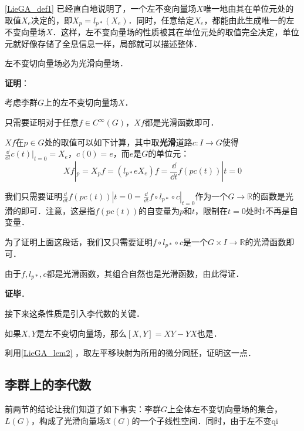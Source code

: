 \autoref{LieGA_def1} 已经直白地说明了，一个左不变向量场$X$唯一地由其在单位元处的取值$X_e$决定的，即$X_p=l_{p*}(X_e)$．同时，任意给定$X_e$，都能由此生成唯一的左不变向量场$X$．这样，左不变向量场的性质被其在单位元处的取值完全决定，单位元就好像存储了全息信息一样，局部就可以描述整体．

\begin{theorem}{}
左不变切向量场必为光滑向量场．
\end{theorem}

\textbf{证明}：

考虑李群$G$上的左不变切向量场$X$．

只需要证明对于任意$f\in C^{\infty}(G)$，$Xf$都是光滑函数即可．

$Xf$在$p\in G$处的取值可以如下计算，其中取\textbf{光滑}道路$c:I\to G$使得$\frac{\dd}{\dd t}c(t)|_{t=0}=X_e$，$c(0)=e$，而$e$是$G$的单位元：
\begin{equation}
Xf|_p=X_pf=(l_{p*}eX_e)f=\frac{\dd}{\dd t}f(pc(t))|{t=0}
\end{equation}

我们只需要证明$\frac{\dd}{\dd t}f(pc(t))|{t=0}=\frac{\dd}{\dd t}f\circ l_{p*}\circ c|_{t=0}$作为一个$G\to \mathbb{R}$的函数是光滑的即可．注意，这是指$f(pc(t))$的自变量为$p$和$t$，限制在$t=0$处时$t$不再是自变量．

为了证明上面这段话，我们又只需要证明$f\circ l_{p*}\circ c$是一个$G\times I\to \mathbb{R}$的光滑函数即可．

由于$f, l_{p*}, c$都是光滑函数，其组合自然也是光滑函数，由此得证．

\textbf{证毕}．

接下来这条性质是引入李代数的关键．

\begin{exercise}{}
如果$X, Y$是左不变切向量场，那么$[X, Y]=XY-YX$也是．

利用\autoref{LieGA_lem2} ，取左平移映射为所用的微分同胚，证明这一点．
\end{exercise}


\subsection{李群上的李代数}

前两节的结论让我们知道了如下事实：李群$G$上全体左不变切向量场的集合，$L(G)$，构成了光滑向量场$\mathfrak{X}(G)$的一个子线性空间．同时，由于左不变qi















